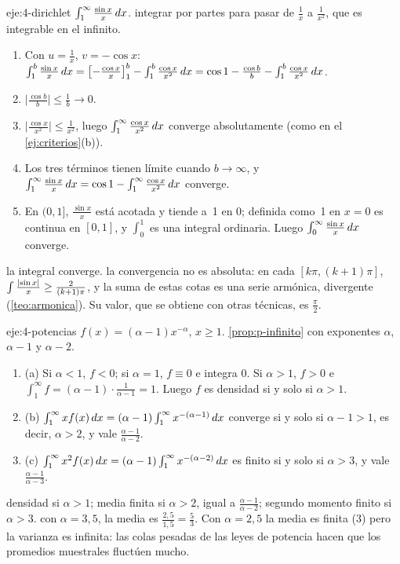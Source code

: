 \begin{solucion}{eje:4-dirichlet}
\datos $\int_1^{\infty}\frac{\sin x}{x}\mathop{}\!d x$.
\planteamiento integrar por partes para pasar de $\frac1x$ a $\frac{1}{x^{2}}$, que es integrable en el infinito.
\pasos
\begin{enumerate}[label=\arabic*.]
  \item Con $u=\frac1x$, $v=-\cos x$: $\int_1^{b}\frac{\sin x}{x}\mathop{}\!d x=\bigl[-\frac{\cos x}{x}\bigr]_{1}^{b}-\int_1^{b}\frac{\cos x}{x^{2}}\mathop{}\!d x=\cos1-\frac{\cos b}{b}-\int_1^{b}\frac{\cos x}{x^{2}}\mathop{}\!d x$.
  \item $\bigl|\frac{\cos b}{b}\bigr|\le\frac1b\to0$.
  \item $\bigl|\frac{\cos x}{x^{2}}\bigr|\le\frac{1}{x^{2}}$, luego $\int_1^{\infty}\frac{\cos x}{x^{2}}\mathop{}\!d x$ converge absolutamente (como en el \cref{ej:criterios}(b)).
  \item Los tres términos tienen límite cuando $b\to\infty$, y $\int_1^{\infty}\frac{\sin x}{x}\mathop{}\!d x=\cos1-\int_1^{\infty}\frac{\cos x}{x^{2}}\mathop{}\!d x$ converge.
  \item En $(0,1]$, $\frac{\sin x}{x}$ está acotada y tiende a~1 en $0$; definida como~1 en $x=0$ es continua en $[0,1]$, y $\int_0^{1}$ es una integral ordinaria. Luego $\int_0^{\infty}\frac{\sin x}{x}\mathop{}\!d x$ converge.
\end{enumerate}
\resultado la integral converge.
\comprobacion la convergencia no es absoluta: en cada $[k\pi,(k+1)\pi]$, $\int\frac{\lvert\sin x\rvert}{x}\ge\frac{2}{(k+1)\pi}$, y la suma de estas cotas es una serie armónica, divergente (\cref{teo:armonica}). Su valor, que se obtiene con otras técnicas, es $\frac\pi2$.
\end{solucion}

\begin{solucion}{eje:4-potencias}
\datos $f(x)=(\alpha-1)x^{-\alpha}$, $x\ge1$.
\planteamiento \cref{prop:p-infinito} con exponentes $\alpha$, $\alpha-1$ y $\alpha-2$.
\pasos
\begin{enumerate}[label=\arabic*.]
  \item (a) Si $\alpha<1$, $f<0$; si $\alpha=1$, $f\equiv0$ e integra $0$. Si $\alpha>1$, $f>0$ e $\int_1^{\infty}f=(\alpha-1)\cdot\frac{1}{\alpha-1}=1$. Luego $f$ es densidad si y solo si $\alpha>1$.
  \item (b) $\int_1^{\infty}xf(x)\mathop{}\!d x=(\alpha-1)\int_1^{\infty}x^{-(\alpha-1)}\mathop{}\!d x$ converge si y solo si $\alpha-1>1$, es decir, $\alpha>2$, y vale $\frac{\alpha-1}{\alpha-2}$.
  \item (c) $\int_1^{\infty}x^{2}f(x)\mathop{}\!d x=(\alpha-1)\int_1^{\infty}x^{-(\alpha-2)}\mathop{}\!d x$ es finito si y solo si $\alpha>3$, y vale $\frac{\alpha-1}{\alpha-3}$.
\end{enumerate}
\resultado densidad si $\alpha>1$; media finita si $\alpha>2$, igual a $\frac{\alpha-1}{\alpha-2}$; segundo momento finito si $\alpha>3$.
\comprobacion con $\alpha=3{,}5$, la media es $\frac{2{,}5}{1{,}5}=\frac53$. Con $\alpha=2{,}5$ la media es finita ($3$) pero la varianza es infinita: las colas pesadas de las leyes de potencia hacen que los promedios muestrales fluctúen mucho.
\end{solucion}

